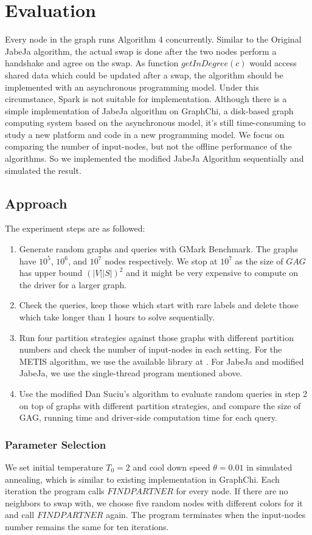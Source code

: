 \section{Evaluation}
Every node in the graph runs Algorithm 4 concurrently. Similar to the Original JabeJa algorithm, the actual swap is done after the two nodes perform a handshake and agree on the swap. As function $getInDegree(c)$ would access shared data which could be updated after a swap, the algorithm should be implemented with an asynchronous programming model. Under this circumstance, Spark is not suitable for implementation. Although there is a simple implementation\cite{jabejagraphchi} of JabeJa algorithm on GraphChi\cite{kyrola2012graphchi}, a disk-based graph computing system based on the asynchronous model, it's still time-consuming to study a new platform and code in a new programming model. We focus on comparing the number of input-nodes, but not the offline performance of the algorithms. So we implemented the modified JabeJa Algorithm sequentially and simulated the result.
\subsection{Approach}
The experiment steps are as followed:
\begin{enumerate}
    \item Generate random graphs and queries with GMark Benchmark. The graphs have $10^5$, $10^6$, and $10^7$ nodes respectively. We stop at $10^7$ as the size of $GAG$ has upper bound $(|V||S|)^2$ and it might be very expensive to compute on the driver for a larger graph.
    \item Check the queries, keep those which start with rare labels and delete those which take longer than 1 hours to solve sequentially.
    \item Run four partition strategies against those graphs with different partition numbers and check the number of input-nodes in each setting. For the METIS algorithm, we use the available library at \cite{metislib}. For JabeJa and modified JabeJa, we use the single-thread program mentioned above.
    \item Use the modified Dan Suciu's algorithm to evaluate random queries in step 2 on top of graphs with different partition strategies, and compare the size of GAG, running time and driver-side computation time for each query.
\end{enumerate}
\subsubsection{Parameter Selection} We set initial temperature $T_0 = 2$ and cool down speed $\theta = 0.01$ in simulated annealing, which is similar to existing implementation in GraphChi. Each iteration the program calls $FINDPARTNER$ for every node. If there are no neighbors to swap with, we choose five random nodes with different colors for it and call $FINDPARTNER$ again. The program terminates when the input-nodes number remains the same for ten iterations.

